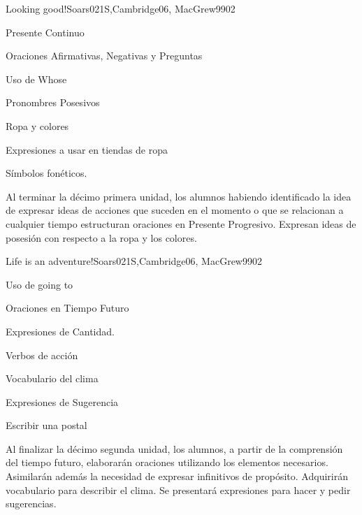 \begin{syllabus}
\begin{unit}{Looking good!}{}{Soars021S,Cambridge06, MacGrew99}{0}{2}
   \begin{topics}
      \item Presente Continuo
      \item Oraciones Afirmativas, Negativas y Preguntas
      \item Uso de Whose
      \item Pronombres Posesivos
      \item Ropa y colores
      \item Expresiones a usar en tiendas de ropa
      \item Símbolos fonéticos.
   \end{topics}

   \begin{learningoutcomes}
      \item Al terminar la décimo primera unidad, los alumnos habiendo identificado la idea de expresar ideas de acciones que suceden en el momento o que se relacionan a cualquier tiempo estructuran oraciones en Presente Progresivo. Expresan ideas de posesión con respecto a la ropa y los colores.
   \end{learningoutcomes}

\end{unit}

\begin{unit}{Life is an adventure!}{}{Soars021S,Cambridge06, MacGrew99}{0}{2}
   \begin{topics}
      \item Uso de going to
      \item Oraciones en Tiempo Futuro
      \item Expresiones de Cantidad.
      \item Verbos de acción
      \item Vocabulario del clima
      \item Expresiones de Sugerencia
      \item Escribir una postal
   \end{topics}
   \begin{learningoutcomes}
      \item Al finalizar la décimo segunda unidad, los alumnos, a partir de la comprensión del tiempo futuro, elaborarán oraciones utilizando los elementos necesarios. Asimilarán además la necesidad de expresar infinitivos de propósito. Adquirirán vocabulario para describir el clima. Se presentará expresiones para hacer y pedir sugerencias.
   \end{learningoutcomes}
\end{unit}


\end{syllabus}
